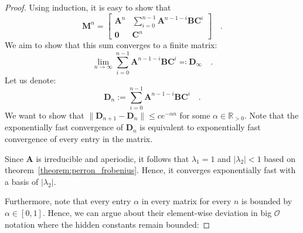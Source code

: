 \documentclass[../../main.tex]{subfiles}
\begin{document}
    \begin{proof}
        Using induction, it is easy to show that
        \[
            \bm{M}^n =
            \begin{bmatrix}
            \bm{A}^n & \sum_{i=0}^{n-1} \bm{A}^{n-1-i} \bm{B} \bm{C}^i \\
            \bm{0} & \bm{C}^n
            \end{bmatrix}
            \quad .
        \]
        We aim to show that this sum converges to a finite matrix:
        \[
        \lim_{n \to \infty} \sum_{i=0}^{n-1} \bm{A}^{n-1-i} \bm{B} \bm{C}^i \eqqcolon \bm{D}_\infty \quad .
        \]
        Let us denote:
        \[
        \bm{D}_n := \sum_{i=0}^{n-1} \bm{A}^{n-1-i} \bm{B} \bm{C}^i \quad .
        \]
        We want to show that $\|\bm{D}_{n+1} - \bm{D}_{n}\| \leq c e^{-\alpha n}$ for some $\alpha \in \mathbb{R}_{> 0}$. Note that the exponentially fast convergence of $\bm{D}_{n}$ is equivalent to exponentially fast convergence of every entry in the matrix.
        
        Since $\bm{A}$ is irreducible and aperiodic, it follows that $\lambda_1 = 1$ and $|\lambda_2| < 1$ based on theorem~\ref{theorem:perron_frobenius}. Hence, it converges exponentially fast with a basis of $|\lambda_2|$.

        Furthermore, note that every entry $\alpha$ in every matrix for every $n$ is bounded by $\alpha \in [0, 1]$. Hence, we can argue about their element-wise deviation in big $\mathcal{O}$ notation where the hidden constants remain bounded:


\end{proof}
\end{document}

